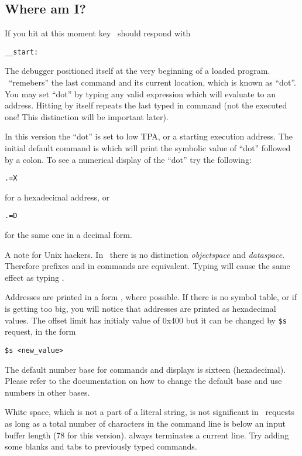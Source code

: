 \subsection{Where am I?}
If you hit at this moment  key \szadb\ should respond
with
\begin{exmpl}
	\verb|__start:|
\end{exmpl}
The debugger positioned itself at the very beginning of a loaded program.
\szadb\ ``remebers'' the last command and its current location, which
is known as ``dot''.  You may set ``dot'' by typing any valid expression
which will evaluate to an address. Hitting  by itself repeats
the last typed in command (not the executed one! This distinction will
be important later).

In this version the ``dot'' is set to low TPA, or a starting execution address.
The initial default command is 
which will print the symbolic value of ``dot'' followed by a colon.
To see a numerical display of the ``dot'' try the following:
\begin{exmpl}
	{\tt .=X }
\end{exmpl}
for a hexadecimal address, or
\begin{exmpl}
	{\tt .=D }
\end{exmpl}
for the same one in a decimal form.

A note for {\sc Unix} hackers. In \szadb\ there is no distinction
{\it objectspace} and {\it dataspace}.
Therefore prefixes  and \name{/} in commands are equivalent.
Typing  will cause the same effect as typing .

Addresses are printed in a form , where possible.
If there is no symbol table, or if  is getting too big,
you will notice that addresses are printed as hexadecimal values.
The offset limit has initialy value of 0x400 but it can be changed by
\verb|$s| request, in the form 
\begin{exmpl}
	\verb|$s <new_value>|
\end{exmpl}
The default number base for commands and displays is sixteen (hexadecimal).
Please refer to the documentation on how to change the default base and use
numbers in other bases.

White space, which is not a part of a literal string, is not significant
in \szadb\ requests as long as a total number of characters in the command
line is below an input buffer length (78 for this version).  
always terminates a current line.
Try adding some blanks and tabs to previously typed commands.

